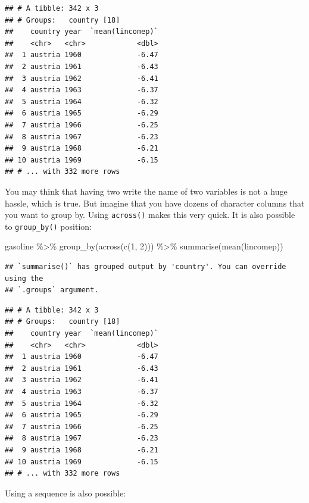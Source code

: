 \documentclass[
]{article}
\newenvironment{Shaded}{\begin{snugshade}}{\end{snugshade}}
\newcommand{\DecValTok}[1]{\textcolor[rgb]{0.00,0.00,0.81}{#1}}
\newcommand{\FunctionTok}[1]{\textcolor[rgb]{0.00,0.00,0.00}{#1}}
\newcommand{\NormalTok}[1]{#1}
\newcommand{\SpecialCharTok}[1]{\textcolor[rgb]{0.00,0.00,0.00}{#1}}
\begin{document}
\begin{verbatim}
## # A tibble: 342 x 3
## # Groups:   country [18]
##    country year  `mean(lincomep)`
##    <chr>   <chr>            <dbl>
##  1 austria 1960             -6.47
##  2 austria 1961             -6.43
##  3 austria 1962             -6.41
##  4 austria 1963             -6.37
##  5 austria 1964             -6.32
##  6 austria 1965             -6.29
##  7 austria 1966             -6.25
##  8 austria 1967             -6.23
##  9 austria 1968             -6.21
## 10 austria 1969             -6.15
## # ... with 332 more rows
\end{verbatim}

You may think that having two write the name of two variables is not a huge hassle, which is true.
But imagine that you have dozens of character columns that you want to group by. Using \texttt{across()}
makes this very quick. It is also possible to \texttt{group\_by()} position:

\begin{Shaded}
\begin{Highlighting}[]
\NormalTok{gasoline }\SpecialCharTok{\%\textgreater{}\%}
    \FunctionTok{group\_by}\NormalTok{(}\FunctionTok{across}\NormalTok{(}\FunctionTok{c}\NormalTok{(}\DecValTok{1}\NormalTok{, }\DecValTok{2}\NormalTok{))) }\SpecialCharTok{\%\textgreater{}\%}
    \FunctionTok{summarise}\NormalTok{(}\FunctionTok{mean}\NormalTok{(lincomep))}
\end{Highlighting}
\end{Shaded}

\begin{verbatim}
## `summarise()` has grouped output by 'country'. You can override using the
## `.groups` argument.
\end{verbatim}

\begin{verbatim}
## # A tibble: 342 x 3
## # Groups:   country [18]
##    country year  `mean(lincomep)`
##    <chr>   <chr>            <dbl>
##  1 austria 1960             -6.47
##  2 austria 1961             -6.43
##  3 austria 1962             -6.41
##  4 austria 1963             -6.37
##  5 austria 1964             -6.32
##  6 austria 1965             -6.29
##  7 austria 1966             -6.25
##  8 austria 1967             -6.23
##  9 austria 1968             -6.21
## 10 austria 1969             -6.15
## # ... with 332 more rows
\end{verbatim}

Using a sequence is also possible:
\end{document}
